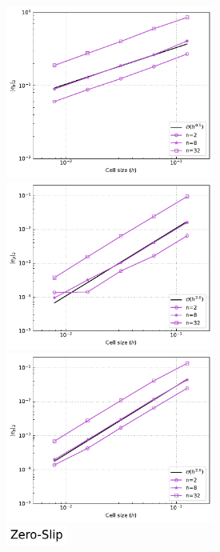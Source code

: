\documentclass[12pt]{article}
\numberwithin{equation}{subsection}
\begin{document}
\begin{figure}
	\begin{multicols}{3}
	    \includegraphics[width=6.85cm]{../Annulus_Benchmark_Kramer/benchmark_figs/case1_k_0_p_err_conv_vel_penalty_2.5e+08_stokes_tol_1.0e-10.pdf}\par
		\hspace{-0.08in} 
		\includegraphics[width=6.85cm]{../Annulus_Benchmark_Kramer/benchmark_figs/case2_k_2_p_err_conv_vel_penalty_2.5e+08_stokes_tol_1.0e-10.pdf}\par
		\hspace{-0.12in}
		\includegraphics[width=6.85cm]{../Annulus_Benchmark_Kramer/benchmark_figs/case2_k_8_p_err_conv_vel_penalty_2.5e+08_stokes_tol_1.0e-10.pdf}
	\end{multicols}
	
	\vspace{-0.2in}
	\begin{multicols}{1}
		\hspace{3.65in} \includegraphics[width=2cm]{../Annulus_Benchmark_Kramer/benchmark_figs/label_Zero-Slip.pdf}
	\end{multicols}
	

\end{figure}
\end{document}
